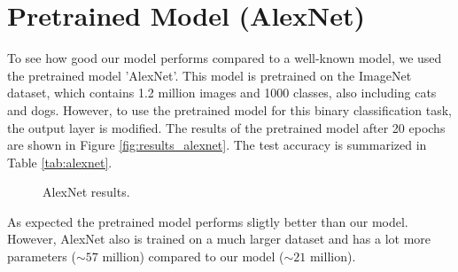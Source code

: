 \section{Pretrained Model (AlexNet)}
To see how good our model performs compared to a well-known model, we used the pretrained model 'AlexNet'.
This model is pretrained on the ImageNet dataset, which contains 1.2 million images and 1000 classes, also including cats and dogs.
However, to use the pretrained model for this binary classification task, the output layer is modified.
The results of the pretrained model after 20 epochs are shown in Figure \ref{fig:results_alexnet}. The test accuracy is summarized in Table \ref{tab:alexnet}.

\begin{figure}[H]
    \vspace*{-0.7cm}
    \centering
    \hspace{0.4cm}
    \caption{AlexNet results.}
    \label{fig:alexnet}
    \vspace*{-0.7cm}
\end{figure}


As expected the pretrained model performs sligtly better than our model.
However, AlexNet also is trained on a much larger dataset and has a lot more parameters ($\sim 57$ million) compared to our model ($\sim 21$ million).